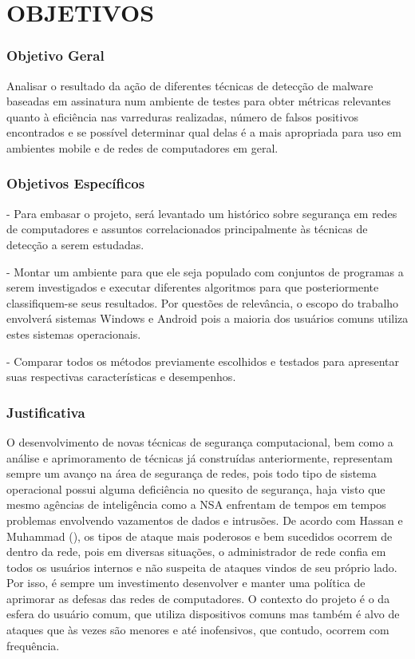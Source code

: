 \chapter{OBJETIVOS}
\label{c.objetivos}

 

\subsection{Objetivo Geral}
\label{s.objetivog}

Analisar o resultado da ação de diferentes técnicas de detecção de malware
baseadas em assinatura num ambiente de testes para obter métricas relevantes
quanto à eficiência nas varreduras realizadas, número de falsos positivos
encontrados e se possível determinar qual delas é a mais apropriada para uso
em ambientes mobile e de redes de computadores em geral.
 
\subsection{Objetivos Específicos}
\label{s.ojetivosp}

- Para embasar o projeto, será levantado um histórico sobre segurança em redes
  de computadores e assuntos correlacionados principalmente às técnicas de
  detecção a serem estudadas.

- Montar um ambiente para que ele seja populado com conjuntos de programas a
  serem investigados e executar diferentes algoritmos para que posteriormente
  classifiquem-se seus resultados. Por questões de relevância, o escopo do
  trabalho envolverá sistemas Windows e Android pois a maioria dos usuários
  comuns utiliza estes sistemas operacionais.

- Comparar todos os métodos previamente escolhidos e testados para apresentar
  suas respectivas características e desempenhos.


\subsection{Justificativa}
\label{s.justificativa}

O desenvolvimento de novas técnicas de segurança computacional, bem como a
análise e aprimoramento de técnicas já construídas anteriormente, representam
sempre um avanço na área de segurança de redes, pois todo tipo de sistema
operacional possui alguma deficiência no quesito de segurança, haja visto que
mesmo agências de inteligência como a NSA enfrentam de tempos em tempos
problemas envolvendo vazamentos de dados e intrusões. De acordo com Hassan e
Muhammad (\citeyear{hassan10}), os tipos de ataque mais poderosos e bem
sucedidos ocorrem de dentro da rede, pois em diversas situações, o
administrador de rede confia em todos os usuários internos e não suspeita de
ataques vindos de seu próprio lado. Por isso, é sempre um investimento
desenvolver e manter uma política de aprimorar as defesas das redes de
computadores. O contexto do projeto é o da esfera do usuário comum, que
utiliza dispositivos comuns mas também é alvo de ataques que às vezes são
menores e até inofensivos, que contudo, ocorrem com frequência.

